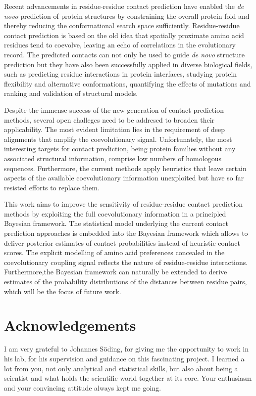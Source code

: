 \documentclass[11pt,a4paper,twoside]{book}
\theoremstyle{definition}
\theoremstyle{definition}
\theoremstyle{remark}
\begin{document}
Recent advancements in residue-residue contact prediction have enabled
the \emph{de novo} prediction of protein structures by constraining the
overall protein fold and thereby reducing the conformational search
space sufficiently. Residue-residue contact prediction is based on the
old idea that spatially proximate amino acid residues tend to coevolve,
leaving an echo of correlations in the evolutionary record. The
predicted contacts can not only be used to guide \emph{de novo}
structure prediction but they have also been successfully applied in
diverse biological fields, such as predicting residue interactions in
protein interfaces, studying protein flexibility and alternative
conformations, quantifying the effects of mutations and ranking and
validation of structural models.

Despite the immense success of the new generation of contact prediction
methods, several open challeges need to be addresed to broaden their
applicability. The most evident limitation lies in the requirement of
deep alignments that amplify the coevolutionary signal. Unfortunately,
the most interesting targets for contact prediction, being protein
families without any associated structural information, comprise low
numbers of homologous sequences. Furthermore, the current methods apply
heuristics that leave certain aspects of the available coevolutionary
information unexploited but have so far resisted efforts to replace
them.

This work aims to improve the sensitivity of residue-residue contact
prediction methods by exploiting the full coevolutionary information in
a principled Bayesian framework. The statistical model underlying the
current contact prediction approaches is embedded into the Bayesian
framework which allows to deliver posterior estimates of contact
probabilities instead of heuristic contact scores. The explicit
modelling of amino acid preferences concealed in the coevolutionary
coupling signal reflects the nature of residue-residue interactions.
Furthermore,the Bayesian framework can naturally be extended to derive
estimates of the probability distributions of the distances between
residue pairs, which will be the focus of future work.

\chapter*{Acknowledgements}\label{acknowledgements}

I am very grateful to Johannes Söding, for giving me the opportunity to
work in his lab, for his supervision and guidance on this fascinating
project. I learned a lot from you, not only analytical and statistical
skills, but also about being a scientist and what holds the scientific
world together at its core. Your enthusiasm and your convincing attitude
always kept me going.
\end{document}
